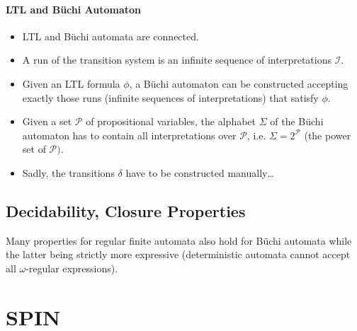 			\subsubsection{LTL and Büchi Automaton}
				\begin{itemize}
					\item LTL and Büchi automata are connected.
					\item A run of the transition system is an infinite sequence of interpretations \(\mathcal{I}\).
					\item Given an LTL formula \(\phi\), a Büchi automaton can be constructed accepting exactly those runs (infinite sequences of interpretations) that satisfy \(\phi\).
					\item Given a set \(\mathcal{P}\) of propositional variables, the alphabet \(\Sigma\) of the Büchi automaton has to contain all interpretations over \(\mathcal{P}\), i.e. \(\Sigma = 2^\mathcal{P}\) (the power set of \(\mathcal{P})\).
					\item Sadly, the transitions \(\delta\) have to be constructed manually\dots
				\end{itemize}

	\section{Decidability, Closure Properties}
		Many properties for regular finite automata also hold for Büchi automata while the latter being strictly more expressive (deterministic automata cannot accept all \(\omega\)-regular expressions).
		


\chapter{SPIN}
	\label{c:spin}
	
